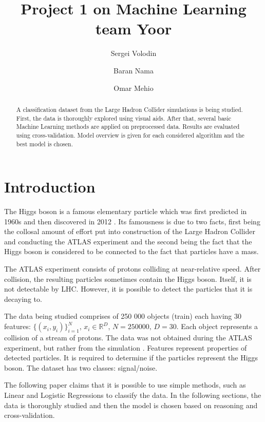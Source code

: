 \documentclass[10pt,conference,compsocconf]{IEEEtran}
\title{Project 1 on Machine Learning team Yoor}
\author[1]{Sergei Volodin}
\author[1]{Baran Nama}
\author[1]{Omar Mehio}
\affil[1]{EPFL}
\affil[ ]{\textit {\{sergei.volodin,baran.nama,omar.mehio\}@epfl.ch}}
\begin{document}
\maketitle

\begin{abstract}
A classification dataset from the Large Hadron Collider simulations is being studied. First, the data is thoroughly explored using visual aids.
After that, several basic Machine Learning methods are applied on preprocessed data.
Results are evaluated using cross-validation.
Model overview is given for each considered algorithm and the best model is chosen.
\end{abstract}

\section{Introduction}
The Higgs boson is a famous elementary particle which was first predicted in 1960s and then discovered in 2012 \cite{higgs}. Its famousness is due to two facts, first being the collosal amount of effort put into construction of the Large Hadron Collider and conducting the ATLAS experiment and the second being the fact that the Higgs boson is considered to be connected to the fact that particles have a mass.

The ATLAS experiment consists of protons colliding at near-relative speed. After collision, the resulting particles sometimes contain the Higgs boson. Itself, it is not detectable by LHC. However, it is possible to detect the particles that it is decaying to.

The data being studied comprises of 250 000 objects (train) each having 30 features: $\{(x_i,y_i)\}_{i=1}^N$, $x_i\in\mathbb{R}^D$, $N=250 000,\,D=30$. Each object represents a collision of a stream of protons. The data was not obtained during the ATLAS experiment, but rather from the simulation \cite{data}. Features represent properties of detected particles. It is required to determine if the particles represent the Higgs boson. The dataset has two classes: signal/noise.

The following paper claims that it is possible to use simple methods, such as Linear and Logistic Regressions to classify the data. In the following sections, the data is thoroughly studied and then the model is chosen based on reasoning and cross-validation.
\end{document}
